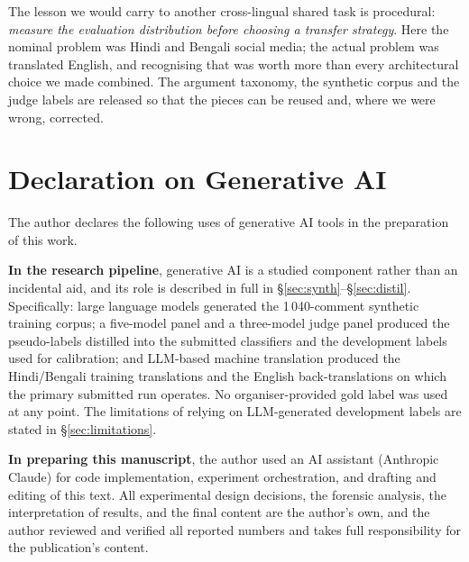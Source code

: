 \documentclass[twocolumn]{ceurart}
\begin{document}
The lesson we would carry to another cross-lingual shared task is procedural:
\emph{measure the evaluation distribution before choosing a transfer strategy}.
Here the nominal problem was Hindi and Bengali social media; the actual problem
was translated English, and recognising that was worth more than every
architectural choice we made combined. The argument taxonomy, the synthetic
corpus and the judge labels are released so that the pieces can be reused and,
where we were wrong, corrected.

\section*{Declaration on Generative AI}

The author declares the following uses of generative AI tools in the
preparation of this work.

\textbf{In the research pipeline}, generative AI is a studied component rather
than an incidental aid, and its role is described in full in
\S\ref{sec:synth}--\S\ref{sec:distil}. Specifically: large language models
generated the 1\,040-comment synthetic training corpus; a five-model panel and a
three-model judge panel produced the pseudo-labels distilled into the submitted
classifiers and the development labels used for calibration; and LLM-based
machine translation produced the Hindi/Bengali training translations and the
English back-translations on which the primary submitted run operates. No
organiser-provided gold label was used at any point. The limitations of relying
on LLM-generated development labels are stated in \S\ref{sec:limitations}.

\textbf{In preparing this manuscript}, the author used an AI assistant
(Anthropic Claude) for code implementation, experiment orchestration, and
drafting and editing of this text. All experimental design decisions, the
forensic analysis, the interpretation of results, and the final content are the
author's own, and the author reviewed and verified all reported numbers and
takes full responsibility for the publication's content.
\end{document}
